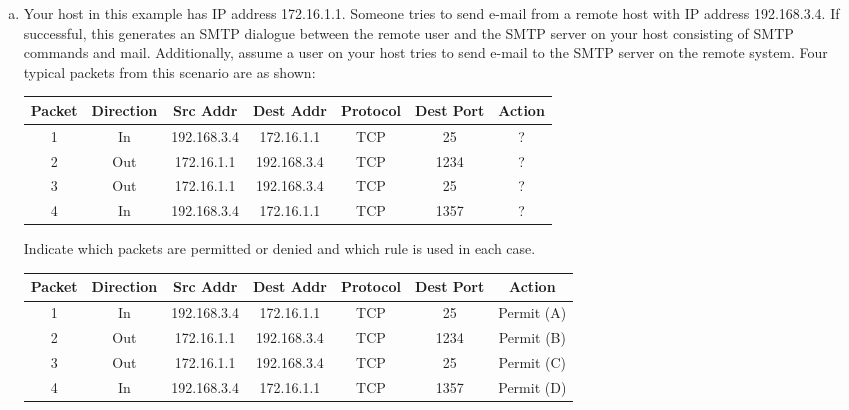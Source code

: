 \documentclass[12pt]{article}
\begin{document}
\begin{description}
\begin{enumerate}[a.]
        
        \item {\color{grey}Your host in this example has IP address 172.16.1.1.  Someone tries to send e-mail from a remote host with IP address 192.168.3.4.  If successful, this generates an SMTP dialogue between the remote user and the SMTP server on your host consisting of SMTP commands and mail.  Additionally, assume a user on your host tries to send e-mail to the SMTP server on the remote system.  Four typical packets from this scenario are as shown:}\par
        \begin{center}
          \begin{tabular}{|c|c|c|c|c|c|c|}
            \hline
            \textbf{Packet} & \textbf{Direction} & \textbf{Src Addr} & \textbf{Dest Addr} & \textbf{Protocol} & \textbf{Dest Port} & \textbf{Action} \\
            \hline
            1 & In & 192.168.3.4 & 172.16.1.1 & TCP & 25 & ? \\
            \hline
            2 & Out & 172.16.1.1 & 192.168.3.4 & TCP & 1234 & ? \\
            \hline
            3 & Out & 172.16.1.1 & 192.168.3.4 & TCP & 25 & ? \\
            \hline
            4 & In & 192.168.3.4 & 172.16.1.1 & TCP & 1357 & ? \\
            \hline
          \end{tabular}
        \end{center} \par
         \vspace{10pt} 
        {\color{grey}Indicate which packets are permitted or denied and which rule is used in each case.} \par
    \vspace{10pt} 
          \begin{tabular}{|c|c|c|c|c|c|c|}
            \hline
            \textbf{Packet} & \textbf{Direction} & \textbf{Src Addr} & \textbf{Dest Addr} & \textbf{Protocol} & \textbf{Dest Port} & \textbf{Action} \\
            \hline
            1 & In & 192.168.3.4 & 172.16.1.1 & TCP & 25 & Permit (A) \\
            \hline
            2 & Out & 172.16.1.1 & 192.168.3.4 & TCP & 1234 & Permit (B) \\
            \hline
            3 & Out & 172.16.1.1 & 192.168.3.4 & TCP & 25 & Permit (C) \\
            \hline
            4 & In & 192.168.3.4 & 172.16.1.1 & TCP & 1357 & Permit (D) \\
            \hline
          \end{tabular}
     

\end{enumerate}
\end{description}
\end{document}
